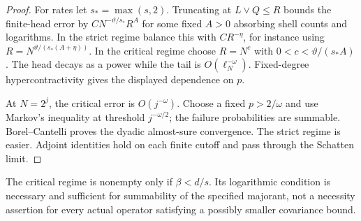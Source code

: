 \documentclass[11pt,a4paper]{amsart}
\numberwithin{equation}{section}
\theoremstyle{definition}
\theoremstyle{remark}
\begin{document}
\begin{proof}
For rates let $s_* =\max(s,2)$. Truncating at $L\vee Q\le R$ bounds the finite-head error by
$CN^{-\vartheta/s_*}R^A$
for some fixed $A>0$ absorbing shell counts and logarithms. In the strict regime balance this with $CR^{-\eta}$, for instance using $R=N^{\vartheta/(s_*(A+\eta))}$. In the critical regime choose $R=N^c$ with $0<c<\vartheta/(s_*A)$. The head decays as a power while the tail is $O(\ell_N^{-\omega})$. Fixed-degree hypercontractivity gives the displayed dependence on $p$.

At $N=2^j$, the critical error is $O(j^{-\omega})$. Choose a fixed $p>2/\omega$ and use Markov's inequality at threshold $j^{-\omega/2}$; the failure probabilities are summable. Borel--Cantelli proves the dyadic almost-sure convergence. The strict regime is easier. Adjoint identities hold on each finite cutoff and pass through the Schatten limit.
\end{proof}
The critical regime is nonempty only if $\beta<d/s$. Its logarithmic condition is necessary and sufficient for summability of the specified majorant, not a necessity assertion for every actual operator satisfying a possibly smaller covariance bound.
\end{document}
